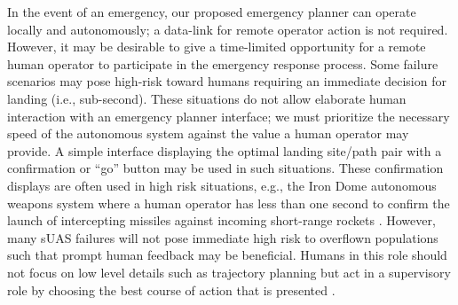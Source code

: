 In the event of an emergency, our proposed emergency planner can operate locally and autonomously; a data-link for remote operator action is not required. However, it may be desirable to give a time-limited opportunity for a remote human operator to participate in the emergency response process. Some failure scenarios may pose high-risk toward humans requiring an immediate decision for landing (i.e., sub-second). These situations do not allow elaborate human interaction with an emergency planner interface; we must prioritize the necessary speed of the autonomous system against the value a human operator may provide. A simple interface displaying the optimal landing site/path pair with a confirmation or ``go'' button may be used in such situations. These confirmation displays are often used in high risk situations, e.g., the Iron Dome autonomous weapons system where a human operator has less than one second to confirm the launch of intercepting missiles against incoming short-range rockets \cite{docherty2012losing}. However, many \ac{sUAS} failures will not pose immediate high risk to overflown populations such that prompt human feedback may be beneficial. Humans in this role should not focus on low level details such as trajectory planning but act in a supervisory role by choosing the best course of action that is presented \cite{gutzwiller_human-computer_2015}.

